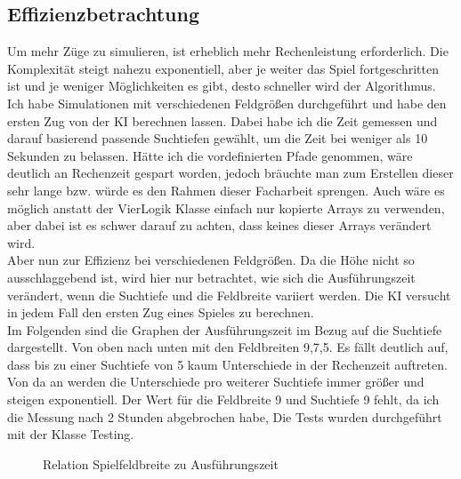 \documentclass[12pt,a4paper]{article}
\begin{document}
	\subsection{Effizienzbetrachtung}
	Um mehr Züge zu simulieren, ist erheblich mehr Rechenleistung erforderlich. Die Komplexität steigt nahezu exponentiell, aber je weiter das Spiel fortgeschritten ist und je weniger Möglichkeiten es gibt, desto schneller wird der Algorithmus. Ich habe Simulationen mit verschiedenen Feldgrößen durchgeführt und habe den ersten Zug von der KI berechnen lassen. Dabei habe ich die Zeit gemessen und darauf basierend passende Suchtiefen gewählt, um die Zeit bei weniger als 10 Sekunden zu belassen. Hätte ich die vordefinierten Pfade genommen, wäre deutlich an Rechenzeit gespart worden, jedoch bräuchte man zum Erstellen dieser sehr lange bzw. würde es den Rahmen dieser Facharbeit sprengen. Auch wäre es möglich anstatt der VierLogik Klasse einfach nur kopierte Arrays zu verwenden, aber dabei ist es schwer darauf zu achten, dass keines dieser Arrays verändert wird.\\
	Aber nun zur Effizienz bei verschiedenen Feldgrößen. Da die Höhe nicht so ausschlaggebend ist, wird hier nur betrachtet, wie sich die Ausführungszeit verändert, wenn die Suchtiefe und die Feldbreite variiert werden. Die KI versucht in jedem Fall den ersten Zug eines Spieles zu berechnen.\\
	Im Folgenden sind die Graphen der Ausführungszeit im Bezug auf die Suchtiefe dargestellt. Von oben nach unten mit den Feldbreiten 9,7,5. Es fällt deutlich auf, dass bis zu einer Suchtiefe von 5 kaum Unterschiede in der Rechenzeit auftreten. Von da an werden die Unterschiede pro weiterer Suchtiefe immer größer und steigen exponentiell. Der Wert für die Feldbreite 9 und Suchtiefe 9 fehlt, da ich die Messung nach 2 Stunden abgebrochen habe, Die Tests wurden durchgeführt mit der Klasse Testing.\\
		\begin{figure}
			\centering
			\label{fig:graph1}
		\caption{Relation Spielfeldbreite zu Ausführungszeit}
		\end{figure}
\end{document}
